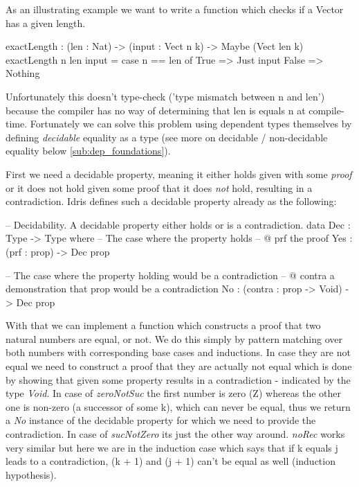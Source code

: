 As an illustrating example we want to write a function which checks if a Vector has a given length. 

\begin{HaskellCode}
exactLength : (len : Nat) -> (input : Vect n k) -> Maybe (Vect len k)
exactLength {n} len input = case n == len of
                                 True  => Just input 
                                 False => Nothing 
\end{HaskellCode}

Unfortunately this doesn't type-check ('type mismatch between n and len') because the compiler has no way of determining that len is equals n at compile-time. Fortunately we can solve this problem using dependent types themselves by defining \textit{decidable} equality as a type (see more on decidable / non-decidable equality below \ref{sub:dep_foundations}).

First we need a decidable property, meaning it either holds given with some \textit{proof} or it does not hold given some proof that it does \textit{not} hold, resulting in a contradiction. Idris defines such a decidable property already as the following:

\begin{HaskellCode}
-- Decidability. A decidable property either holds or is a contradiction.
data Dec : Type -> Type where
  -- The case where the property holds
  -- @ prf the proof
  Yes : (prf : prop) -> Dec prop

  -- The case where the property holding would be a contradiction
  -- @ contra a demonstration that prop would be a contradiction
  No  : (contra : prop -> Void) -> Dec prop
\end{HaskellCode}

With that we can implement a function which constructs a proof that two natural numbers are equal, or not. We do this simply by pattern matching over both numbers with corresponding base cases and inductions. In case they are not equal we need to construct a proof that they are actually not equal which is done by showing that given some property results in a contradiction - indicated by the type \textit{Void}. In case of \textit{zeroNotSuc} the first number is zero (Z) whereas the other one is non-zero (a successor of some k), which can never be equal, thus we return a \textit{No} instance of the decidable property for which we need to provide the contradiction. In case of \textit{sucNotZero} its just the other way around. \textit{noRec} works very similar but here we are in the induction case which says that if k equals j leads to a contradiction, (k + 1) and (j + 1) can't be equal as well (induction hypothesis).

